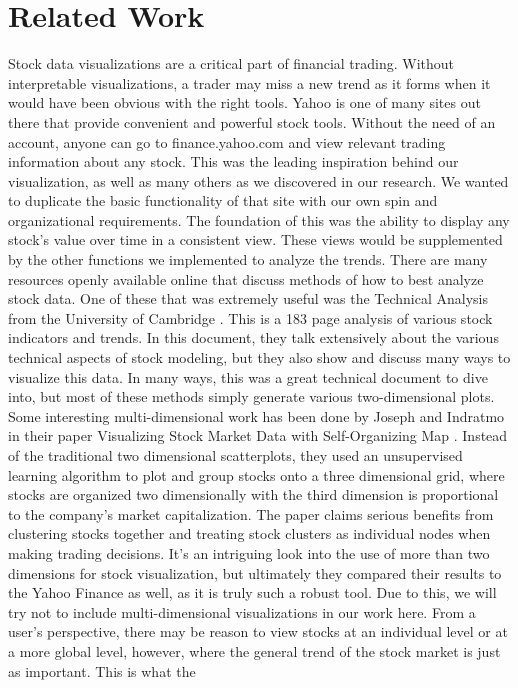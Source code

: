 \documentclass{vgtc}                          %
\begin{document}
\section{Related Work}
Stock data visualizations are a critical part of financial trading. Without interpretable
visualizations, a trader may miss a new trend as it forms when it would have been obvious with the right
tools. Yahoo is one of many sites out there that provide convenient and powerful stock tools. Without
the need of an account, anyone can go to finance.yahoo.com \cite{yahoo} and view relevant trading information
about any stock. This was the leading inspiration behind our visualization, as well as many others as we
discovered in our research. We wanted to duplicate the basic functionality of that site with our own spin
and organizational requirements. The foundation of this was the ability to display any stock’s value over
time in a consistent view. These views would be supplemented by the other functions we implemented
to analyze the trends.
There are many resources openly available online that discuss methods of how to best analyze
stock data. One of these that was extremely useful was the Technical Analysis from the University of
Cambridge \cite{tech}. This is a 183 page analysis of various stock indicators and trends. In this document, they
talk extensively about the various technical aspects of stock modeling, but they also show and discuss
many ways to visualize this data. In many ways, this was a great technical document to dive into, but
most of these methods simply generate various two-dimensional plots.
Some interesting multi-dimensional work has been done by Joseph and Indratmo in their paper
Visualizing Stock Market Data with Self-Organizing Map \cite{simuic}. Instead of the traditional two dimensional
scatterplots, they used an unsupervised learning algorithm to plot and group stocks onto a three
dimensional grid, where stocks are organized two dimensionally with the third dimension is proportional
to the company's market capitalization. The paper claims serious benefits from clustering stocks
together and treating stock clusters as individual nodes when making trading decisions. It’s an intriguing
look into the use of more than two dimensions for stock visualization, but ultimately they compared
their results to the Yahoo Finance as well, as it is truly such a robust tool. Due to this, we will try not to
include multi-dimensional visualizations in our work here.
From a user’s perspective, there may be reason to view stocks at an individual level or at a more
global level, however, where the general trend of the stock market is just as important. This is what the
\end{document}
